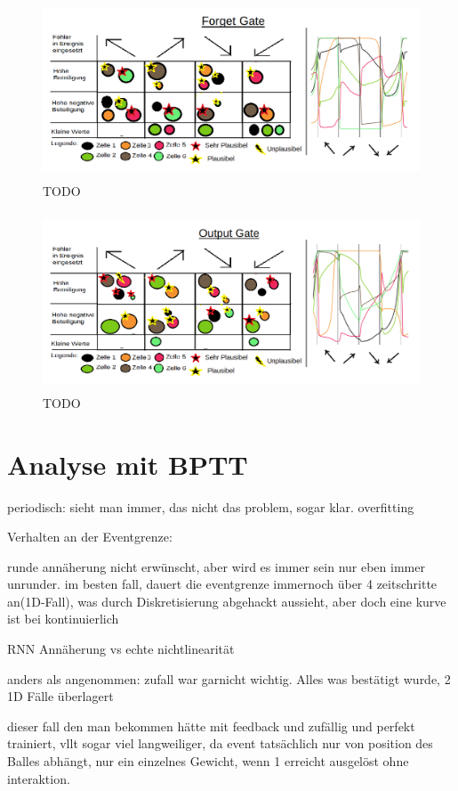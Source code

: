 \begin{figure}
	\centering
	\includegraphics[width=\textwidth, height=200px]{pics/forgetgate.png}	
	\caption{TODO }
	\label{img:forgetgate}
\end{figure}
\begin{figure}
	\centering
	\includegraphics[width=\textwidth, height=200px]{pics/outputgate.png}	
	\caption{TODO }
	\label{img:outputgate}
\end{figure}
\section{Analyse mit BPTT}

periodisch: sieht man immer, das nicht das problem, sogar klar. overfitting

Verhalten an der Eventgrenze:

runde annäherung nicht erwünscht, aber wird es immer sein nur eben immer unrunder. im besten fall, dauert die eventgrenze immernoch über 4 zeitschritte an(1D-Fall), was durch Diskretisierung abgehackt aussieht, aber doch eine kurve ist bei kontinuierlich




RNN Annäherung vs echte nichtlinearität

anders als angenommen: zufall war garnicht wichtig. Alles was bestätigt wurde, 2 1D Fälle überlagert

dieser fall den man bekommen hätte mit feedback und zufällig und perfekt trainiert, vllt sogar viel langweiliger, da event tatsächlich nur von position des Balles abhängt, nur ein einzelnes Gewicht, wenn 1 erreicht ausgelöst ohne interaktion. 


